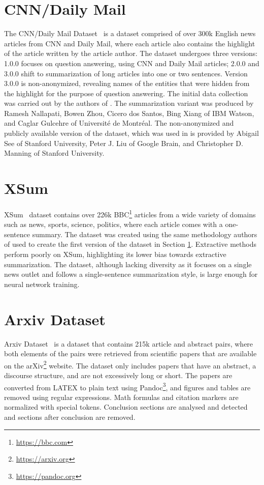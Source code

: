 \documentclass[english, ba, kiv, he, iso690numb, pdf, viewonly]{fasthesis}
\begin{document}
	\section{CNN/Daily Mail}\label{cnn/dm}
	The CNN/Daily Mail Dataset~\cite{HermannKGEKSB15} is a dataset comprised of over 300k English news articles from CNN and Daily Mail, where each article also contains the highlight of the article written by the article author. The dataset undergoes three versions: 1.0.0 focuses on question answering, using CNN and Daily Mail articles; 2.0.0 and 3.0.0 shift to summarization of long articles into one or two sentences. Version 3.0.0 is non-anonymized, revealing names of the entities that were hidden from the highlight for the purpose of question answering. The initial data collection was carried out by the authors of \cite{HermannKGEKSB15}. The summarization variant was produced by Ramesh Nallapati, Bowen Zhou, Cicero dos Santos, Bing Xiang of IBM Watson, and Caglar Gulcehre of Université de Montréal. The non-anonymized and publicly available version of the dataset, which was used in \cite{see-etal-2017-get} is provided by Abigail See of Stanford University, Peter J. Liu of Google Brain, and Christopher D. Manning of Stanford University. 
	
	\section{XSum} \label{sec:xsum}
	XSum~\cite{xsum-emnlp} dataset contains over 226k BBC\footnote{\url{https://bbc.com}} articles from a wide variety of domains such as news, sports, science, politics, where each article comes with a one-sentence summary. The dataset was created using the same methodology authors of \cite{HermannKGEKSB15} used to create the first version of the dataset in Section \ref{cnn/dm}. Extractive methods perform poorly on XSum, highlighting its lower bias towards extractive summarization. The dataset, although lacking diversity as it focuses on a single news outlet and follows a single-sentence summarization style, is large enough for neural network training.
	
	\section{Arxiv Dataset}
	Arxiv Dataset~\cite{cohan2018discourseaware} is a dataset that contains 215k article and abstract pairs, where both elements of the pairs were retrieved from scientific papers that are available on the arXiv\footnote{\url{https://arxiv.org}} website. The dataset only includes papers that have an abstract, a discourse structure, and are not excessively long or short. The papers are converted from LATEX to plain text using Pandoc\footnote{\url{https://pandoc.org}}, and figures and tables are removed using regular expressions. Math formulas and citation markers are normalized with special tokens. Conclusion sections are analysed and detected and sections after conclusion are removed.
	
\end{document}
